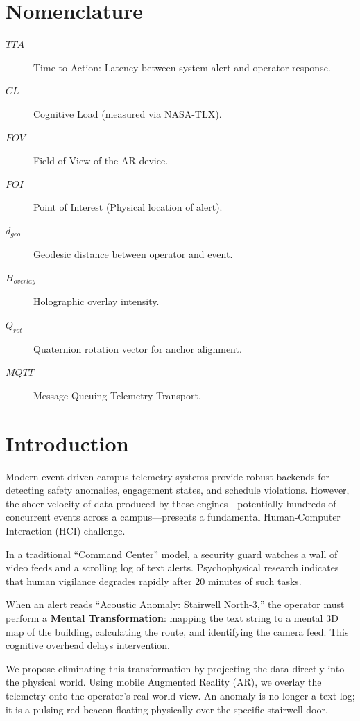 \documentclass[conference]{IEEEtran}
\begin{document}
\section*{Nomenclature}
\begin{description}
    \item[$TTA$] Time-to-Action: Latency between system alert and operator response.
    \item[$CL$] Cognitive Load (measured via NASA-TLX).
    \item[$FOV$] Field of View of the AR device.
    \item[$POI$] Point of Interest (Physical location of alert).
    \item[$d_{geo}$] Geodesic distance between operator and event.
    \item[$H_{overlay}$] Holographic overlay intensity.
    \item[$Q_{rot}$] Quaternion rotation vector for anchor alignment.
    \item[$MQTT$] Message Queuing Telemetry Transport.
\end{description}

\section{Introduction}
Modern event-driven campus telemetry systems provide robust backends for detecting safety anomalies, engagement states, and schedule violations. However, the sheer velocity of data produced by these engines---potentially hundreds of concurrent events across a campus---presents a fundamental Human-Computer Interaction (HCI) challenge. 

In a traditional ``Command Center'' model, a security guard watches a wall of video feeds and a scrolling log of text alerts. Psychophysical research indicates that human vigilance degrades rapidly after 20 minutes of such tasks. 

When an alert reads ``Acoustic Anomaly: Stairwell North-3,'' the operator must perform a \textbf{Mental Transformation}: mapping the text string to a mental 3D map of the building, calculating the route, and identifying the camera feed. This cognitive overhead delays intervention.

We propose eliminating this transformation by projecting the data directly into the physical world. Using mobile Augmented Reality (AR), we overlay the telemetry onto the operator's real-world view. An anomaly is no longer a text log; it is a pulsing red beacon floating physically over the specific stairwell door.
\end{document}
